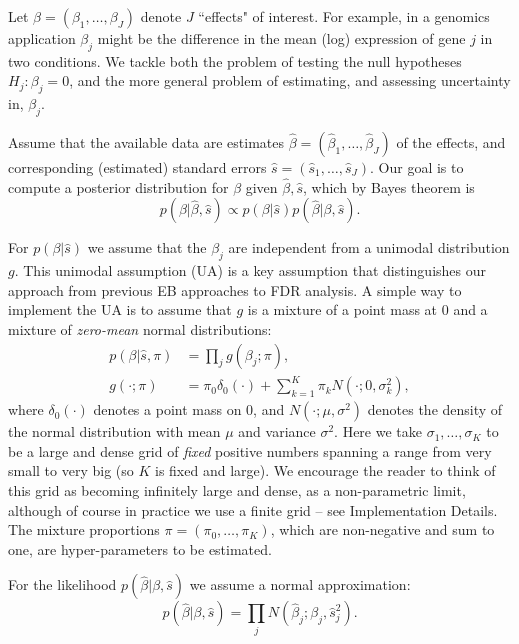 \documentclass[11pt]{article}
\def\bhat{\hat{\beta}}
\def\shat{\hat{s}}
\begin{document}
Let $\beta=(\beta_1,\dots,\beta_J)$ denote $J$ ``effects" of interest. For example, in a genomics application 
$\beta_j$ might be the difference in the mean (log) expression of gene $j$ in two conditions.
We tackle both the problem of testing the null hypotheses $H_j:\beta_j=0$, and the  
more general problem of estimating, and assessing uncertainty in, $\beta_j$.
 
Assume that the available data are estimates $\bhat=(\bhat_1,\dots,\bhat_J)$ of the effects,
and corresponding (estimated) standard errors $\shat=(\shat_1,\dots,\shat_J)$.  Our goal is to compute a posterior distribution for $\beta$ given $\bhat,\shat$,
which by Bayes theorem is
\begin{equation}
p(\beta | \bhat, \shat) \propto p(\beta | \shat) p(\bhat | \beta, \shat).
\end{equation}

For $p(\beta | \shat)$ we assume that the $\beta_j$ are independent from a unimodal distribution $g$.
This unimodal assumption (UA) is a key assumption that distinguishes our approach from previous EB approaches to FDR analysis.
A simple way to implement the UA is to assume that $g$ is
a mixture of a point mass at 0 and a mixture of {\it zero-mean} normal distributions:
\begin{align} \label{eqn:beta}
p(\beta | \shat, \pi) & = \prod_j g(\beta_j; \pi), \\   
g(\cdot; \pi) & = \pi_0 \delta_0(\cdot) + \sum_{k=1}^K \pi_k N(\cdot; 0, \sigma_k^2), \label{eqn:mixnorm}
\end{align}
where $\delta_0(\cdot)$ denotes a point mass on 0, and $N(\cdot; \mu, \sigma^2)$ denotes the density of the normal distribution with mean $\mu$ and variance $\sigma^2$.
Here we take $\sigma_1,\dots,\sigma_K$ to be a large and dense grid of {\it fixed} positive numbers spanning a range from very small to very big (so $K$ is fixed and large). 
We encourage the reader to think of this grid as becoming infinitely large and dense, as a non-parametric limit,
although of course in practice we use a finite grid -- see Implementation Details.
The mixture proportions $\pi=(\pi_0,\dots,\pi_K)$, which are non-negative and sum to one, are 
hyper-parameters to be estimated.


For the likelihood $p(\bhat | \beta, \shat)$ we assume a normal approximation:
\begin{equation} \label{eqn:normlik}
p(\bhat | \beta, \shat) = \prod_j N(\bhat_j; \beta_j, \shat_j^2).
\end{equation}
\end{document}
